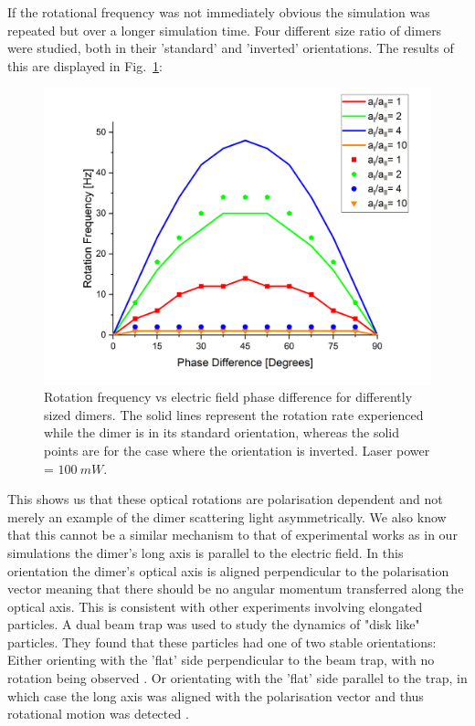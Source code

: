 If the rotational frequency was not immediately obvious the 
simulation was repeated but over a longer simulation time. 
Four different size ratio of dimers were studied, both in 
their 'standard' and 'inverted' orientations. The results 
of this are displayed in Fig.~\ref{fig:rotation_vs_pol}:
\begin{figure}[h!]
	\centering
	\includegraphics[width=0.9\linewidth]{rotation_rate_vs_pol.png}
	\caption{Rotation frequency vs electric field phase difference 
		for differently sized dimers. The solid lines represent 
		the rotation rate experienced while the dimer is in its 
		standard orientation, whereas the solid points are for 
		the case where the orientation is inverted. Laser power = 
		$100\ mW$.}
	\label{fig:rotation_vs_pol}
\end{figure}

This shows us that these optical rotations are polarisation 
dependent and not merely an example of the dimer scattering 
light asymmetrically. We also know that this cannot be a 
similar mechanism to that of experimental works \cite{Ahn2018, 
Reimann2018} as in our simulations the dimer's long axis
is parallel to the electric field. In this orientation 
the dimer's optical axis is aligned perpendicular to the
polarisation vector meaning that there should be no angular
momentum transferred along the optical axis. This is consistent 
with other experiments involving elongated particles. A dual
beam trap was used to study the dynamics of "disk like" particles. 
They found that these particles had one of two stable
orientations: Either orienting with the 'flat' side perpendicular
to the beam trap, with no rotation being observed \cite{Brzobohaty2015}. 
Or orientating with the 'flat' side parallel to the trap, in which 
case the long axis was aligned with the polarisation vector and 
thus rotational motion was detected \cite{Brzobohaty2015}.

